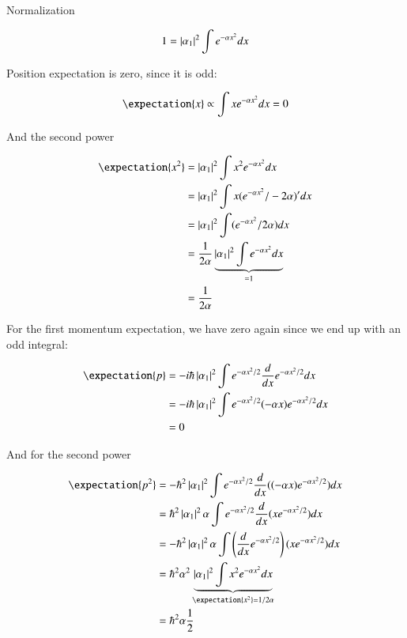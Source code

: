 Normalization

\begin{align*}
1 
&= \left\lvert{\alpha_1}\right\rvert^2 \int e^{-\alpha x^2} dx \\
\end{align*}

Position expectation is zero, since it is odd:

\begin{align*}
\expectation{x} \propto \int x e^{-\alpha x^2} dx = 0
\end{align*}

And the second power

\begin{align*}
\expectation{x^2} 
&= \Abs{\alpha_1}^2 \int x^2 e^{-\alpha x^2} dx \\
&= \Abs{\alpha_1}^2 \int x (e^{-\alpha x^2}/-2\alpha)' dx \\
&= \Abs{\alpha_1}^2 \int (e^{-\alpha x^2}/2\alpha) dx \\
&= \inv{2\alpha} \underbrace{\Abs{\alpha_1}^2 \int e^{-\alpha x^2} dx}_{=1} \\
&= \inv{2\alpha}
\end{align*}

For the first momentum expectation, we have zero again since we end up with an odd integral:

\begin{align*}
\expectation{p} 
&= -i \hbar \Abs{\alpha_1}^2 \int e^{-\alpha x^2 /2} \frac{d}{dx} e^{-\alpha x^2 /2} dx \\
&= -i \hbar \Abs{\alpha_1}^2 \int e^{-\alpha x^2 /2} (-\alpha x) e^{-\alpha x^2 /2} dx \\
&= 0
\end{align*}

And for the second power

\begin{align*}
\expectation{p^2} 
&= - \hbar^2 \Abs{\alpha_1}^2 \int e^{-\alpha x^2 /2} \frac{d}{dx} ((-\alpha x) e^{-\alpha x^2 /2}) dx \\
&= \hbar^2 \Abs{\alpha_1}^2 \alpha \int e^{-\alpha x^2 /2} \frac{d}{dx} (x e^{-\alpha x^2 /2}) dx \\
&= -\hbar^2 \Abs{\alpha_1}^2 \alpha \int \left(\frac{d}{dx}e^{-\alpha x^2 /2}\right) (x e^{-\alpha x^2 /2}) dx \\
&= \hbar^2 \alpha^2 \underbrace{\Abs{\alpha_1}^2 \int x^2 e^{-\alpha x^2} dx}_{\expectation{x^2} = 1/2\alpha} \\
&= \hbar^2 \alpha \inv{2}
\end{align*}

